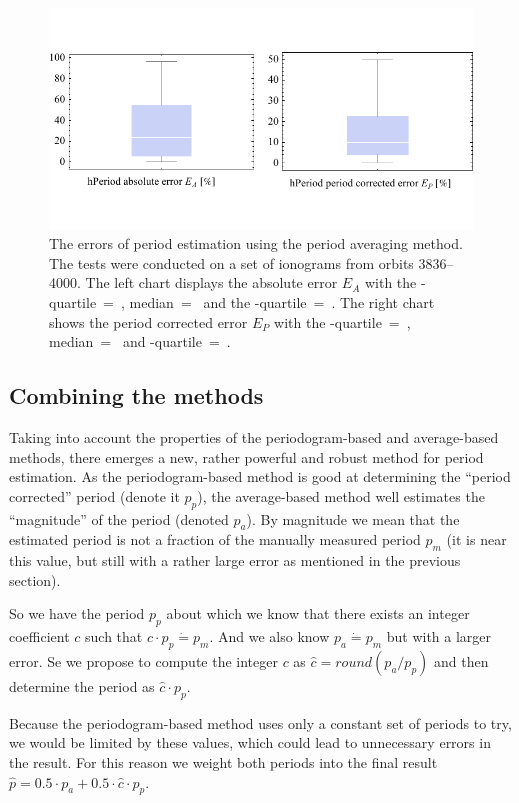 \begin{figure}
	\centering
	\includegraphics[width=140mm]{images/quantile_errors.pdf}
	\caption{The errors of period estimation using the period averaging method. The tests were conducted on a set of ionograms from orbits 3836--4000. The left chart displays the absolute error $E_A$ with the \mbox{-quartile}~=~, median~=~ and the \mbox{-quartile}~=~. The right chart shows the period corrected error $E_P$ with the \mbox{-quartile}~=~, median~=~ and \mbox{-quartile}~=~.}
	\label{fig:quantile_errors}
\end{figure}

\subsection{Combining the methods}
Taking into account the properties of the periodogram-based and average-based methods, there emerges a new, rather powerful and robust method for period estimation. As the periodogram-based method is good at determining the ``period corrected'' period (denote it $p_p$), the average-based method well estimates the ``magnitude'' of the period (denoted $p_a$). By magnitude we mean that the estimated period is not a fraction of the manually measured period $p_m$ (it is near this value, but still with a rather large error as mentioned in the previous section).

So we have the period $p_p$ about which we know that there exists an integer coefficient $c$ such that $c \cdot p_p \dot{=} p_m$. And we also know $p_a \dot{=} p_m$ but with a larger error. Se we propose to compute the integer $c$ as $\hat{c} = round(p_a/p_p)$ and then determine the period as $\hat{c} \cdot p_p$.

Because the periodogram-based method uses only a constant set of periods to try, we would be limited by these values, which could lead to unnecessary errors in the result. For this reason we weight both periods into the final result $\hat{p} = 0.5\cdot p_a + 0.5\cdot \hat{c}\cdot p_p$.  

